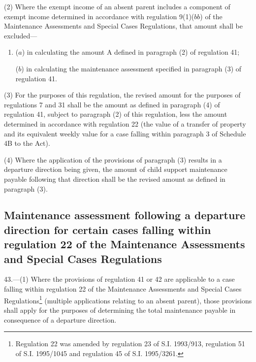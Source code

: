 \documentclass[a4paper]{article}
\begin{document}
(2) Where the exempt income of an absent parent includes a component of exempt
income determined in accordance with regulation 9(1)($bb$) of the Maintenance
Assessments and Special Cases Regulations, that amount shall be excluded—
\begin{enumerate}\item[]
($a$) in calculating the amount A defined in paragraph (2) of regulation 41;

($b$) in calculating the maintenance assessment specified in paragraph (3) of
regulation 41.
\end{enumerate}

(3) For the purposes of this regulation, the revised amount for the purposes of
regulations 7 and 31 shall be the amount as defined in paragraph (4) of
regulation 41, subject to paragraph (2) of this regulation, less the amount
determined in accordance with regulation 22 (the value of a transfer of property
and its equivalent weekly value for a case falling within paragraph 3 of
Schedule 4B to the Act).

(4) Where the application of the provisions of paragraph (3) results in a
departure direction being given, the amount of child support maintenance payable
following that direction shall be the revised amount as defined in paragraph
(3).

\subsection[43. Maintenance assessment following a departure direction for certain cases falling
within regulation 22 of the Maintenance Assessments and Special Cases
Regulations]{Maintenance assessment following a departure direction for certain cases falling
within regulation 22 of the Maintenance Assessments and Special Cases
Regulations}

43.—(1) Where the provisions of regulation 41 or 42 are applicable to
a case falling within regulation 22 of the Maintenance Assessments and Special
Cases Regulations\footnote{\frenchspacing Regulation 22 was amended by regulation 23 of S.I. 1993/913, regulation 51 of S.I. 1995/1045 and regulation 45 of S.I. 1995/3261.} (multiple applications relating to an absent parent),
those provisions shall apply for the purposes of determining the total
maintenance payable in consequence of a departure direction.
\end{document}
